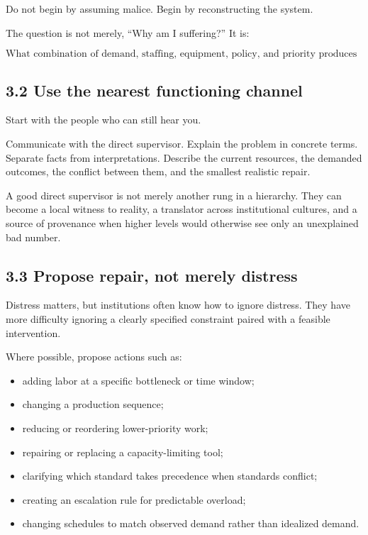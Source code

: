 \documentclass[11pt,oneside]{article}
\providecommand{\tightlist}{%
  \setlength{\itemsep}{0.22em}\setlength{\parskip}{0pt}}
\begin{document}
Do not begin by assuming malice. Begin by reconstructing the system.

The question is not merely, ``Why am I suffering?'' It is:

\[
\text{What combination of demand, staffing, equipment, policy, and priority produces this outcome?}
\]

\subsection{3.2 Use the nearest functioning
channel}\label{use-the-nearest-functioning-channel}

Start with the people who can still hear you.

Communicate with the direct supervisor. Explain the problem in concrete
terms. Separate facts from interpretations. Describe the current
resources, the demanded outcomes, the conflict between them, and the
smallest realistic repair.

A good direct supervisor is not merely another rung in a hierarchy. They
can become a local witness to reality, a translator across institutional
cultures, and a source of provenance when higher levels would otherwise
see only an unexplained bad number.

\subsection{3.3 Propose repair, not merely
distress}\label{propose-repair-not-merely-distress}

Distress matters, but institutions often know how to ignore distress.
They have more difficulty ignoring a clearly specified constraint paired
with a feasible intervention.

Where possible, propose actions such as:

\begin{itemize}
\tightlist
\item
  adding labor at a specific bottleneck or time window;
\item
  changing a production sequence;
\item
  reducing or reordering lower-priority work;
\item
  repairing or replacing a capacity-limiting tool;
\item
  clarifying which standard takes precedence when standards conflict;
\item
  creating an escalation rule for predictable overload;
\item
  changing schedules to match observed demand rather than idealized
  demand.
\end{itemize}
\end{document}
